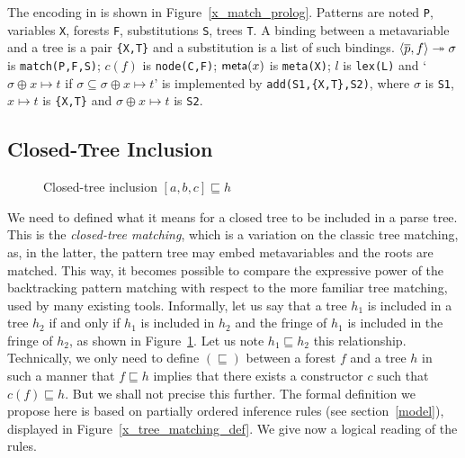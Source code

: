The encoding in \Prolog is shown in Figure~\ref{x_match_prolog}. Patterns
are noted \texttt{P}, variables \texttt{X}, forests \texttt{F},
substitutions \texttt{S}, trees \texttt{T}. A binding between a
meta\-variable and a tree is a pair \texttt{\{X,T\}} and a
substitution is a list of such
bindings. \(\smj{f}{\overline{p}}{\sigma}\) is \texttt{match(P,F,S)};
\(c(f)\) is \texttt{node(C,F)}; \(\meta{x}\) is \texttt{meta(X)};
\(l\) is \texttt{lex(L)} and `\(\sigma \oplus x \mapsto t\) if
\(\sigma \subseteq \sigma \oplus x \mapsto t\)' is implemented by
\texttt{add(S1,\{X,T\},S2)}, where \(\sigma\) is \texttt{S1}, \(x
\mapsto t\) is \texttt{\{X,T\}} and \(\sigma \oplus x \mapsto t\) is
\texttt{S2}.


\subsection{Closed\hyp{}Tree Inclusion}

\begin{figure}[b]
\caption{Closed\hyp{}tree inclusion \([a,b,c] \sqsubseteq h\)}
\label{fig:sqsubseteq}
\end{figure}

We need to defined what it means for a closed tree to be included in a
parse tree. This is the \emph{closed\hyp{}tree matching}, which is a
variation on the classic tree matching, as, in the latter, the pattern
tree may embed meta\-variables and the roots are matched. This way, it
becomes possible to compare the expressive power of the backtracking
pattern matching with respect to the more familiar tree matching, used
by many existing tools. Informally, let us say that a tree \(h_1\) is
included in a tree \(h_2\) if and only if \(h_1\) is included in
\(h_2\) and the fringe of \(h_1\) is included in the fringe of
\(h_2\), as shown in Figure~\ref{fig:sqsubseteq}. Let us note \(h_1
\sqsubseteq h_2\) this relationship. Technically, we only need to
define \((\sqsubseteq)\) between a forest \(f\) and a tree \(h\) in
such a manner that \(f \sqsubseteq h\) implies that there exists a
constructor \(c\) such that \(c(f) \sqsubseteq h\). But we shall not
precise this further. The formal definition we propose here is based
on partially ordered inference rules (see section~\ref{model}),
displayed in Figure~\ref{x_tree_matching_def}. We give now a logical
reading of the rules.

